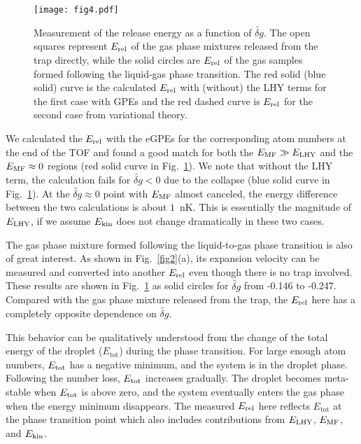 \begin{figure}[hbt]
\begin{center}
\texttt{[image: fig4.pdf]}
\end{center}
\caption[Measurement of the release energy as a function of $\widetilde{\delta g}$]{Measurement of the release energy as a function of $\widetilde{\delta g}$. The open squares represent $E_{\rm rel}$ of the gas phase mixtures released from the trap directly, while the solid circles are $E_{\rm rel}$ of the gas samples formed following the liquid-gas phase transition. The red solid (blue solid) curve is the calculated $E_{\rm rel}$ with (without) the LHY terms for the first case with GPEs and the red dashed curve is $E_{\rm rel}$ for the second case from variational theory.}  
\label{fig4}
\end{figure}

We calculated the $E_{\rm rel}$ with the eGPEs for the corresponding atom numbers at the end of the TOF and found a good match for both the $E_{\rm MF}\gg E_{\rm LHY}$ and the $E_{\rm MF} \approx 0$ regions (red solid curve in Fig.~\ref{fig4}). We note that without the LHY term, the calculation fails for $\widetilde{\delta g} < 0$ due to the collapse (blue solid curve in Fig.~\ref{fig4}). At the $\widetilde{\delta g} \approx 0$ point with $E_{\rm MF}$ almost canceled, the energy difference between the two calculations is about $1$~nK. This is essentially the magnitude of $E_\text{\rm LHY}$, if we assume $E_{\rm kin}$ does not change dramatically in these two cases.   

The gas phase mixture formed following the liquid-to-gas phase transition is also of great interest. As shown in Fig.~\ref{fig2}(a), its expansion velocity can be measured and converted into another $E_{\rm rel}$ even though there is no trap involved. These results are shown in Fig.~\ref{fig4} as solid circles for $\widetilde{\delta g}$ from -0.146 to -0.247. Compared with the gas phase mixture released from the trap, the $E_{\rm rel}$ here has a completely opposite dependence on $\widetilde{\delta g}$. 

This behavior can be qualitatively understood from the change of the total energy of the droplet ($E_\text{tot}$) during the phase transition. For large enough atom numbers, $E_{\rm tot}$ has a negative minimum, and the system is in the droplet phase. Following the number loss, $E_{\rm tot}$ increases gradually. The droplet becomes meta-stable when $E_{\rm tot}$ is above zero, and the system eventually enters the gas phase when the energy minimum disappears. The measured $E_{\rm rel}$ here reflects $E_\text{tot}$ at the phase transition point which also includes contributions from $E_{\rm LHY}$, $E_{\rm MF}$, and $E_{\rm kin}$.

